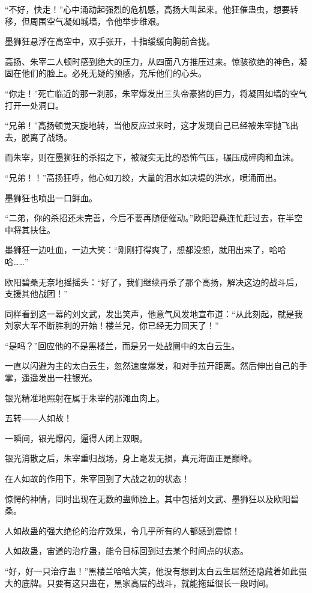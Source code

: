 \begin{this_body}
“不好，快走！”心中涌动起强烈的危机感，高扬大叫起来。他狂催蛊虫，想要转移，但周围空气凝如城墙，令他举步维艰。

墨狮狂悬浮在高空中，双手张开，十指缓缓向胸前合拢。

高扬、朱宰二人顿时感到绝大的压力，从四面八方推压过来。惊骇欲绝的神色，凝固在他们的脸上。必死无疑的预感，充斥他们的心头。

“你走！”死亡临近的那一刹那，朱宰爆发出三头帝豪猪的巨力，将凝固如墙的空气打开一处洞口。

“兄弟！”高扬顿觉天旋地转，当他反应过来时，这才发现自己已经被朱宰抛飞出去，脱离了战场。

而朱宰，则在墨狮狂的杀招之下，被凝实无比的恐怖气压，碾压成碎肉和血沫。

“兄弟！！”高扬狂呼，他心如刀绞，大量的泪水如决堤的洪水，喷涌而出。

墨狮狂也喷出一口鲜血。

“二弟，你的杀招还未完善，今后不要再随便催动。”欧阳碧桑连忙赶过去，在半空中将其扶住。

墨狮狂一边吐血，一边大笑：“刚刚打得爽了，想都没想，就用出来了，哈哈哈……”

欧阳碧桑无奈地摇摇头：“好了，我们继续再杀了那个高扬，解决这边的战斗后，支援其他战团！”

同样看到这一幕的刘文武，发出笑声，他意气风发地宣布道：“从此刻起，就是我刘家大军不断胜利的开始！楼兰兄，你已经无力回天了！”

“是吗？”回应他的不是黑楼兰，而是另一处战圈中的太白云生。

一直以闪避为主的太白云生，忽然速度爆发，和对手拉开距离。然后伸出自己的手掌，遥遥发出一柱银光。

银光精准地照射在属于朱宰的那滩血肉上。

五转――人如故！

一瞬间，银光爆闪，逼得人闭上双眼。

银光消散之后，朱宰重归战场，身上毫发无损，真元海面正是巅峰。

在人如故的作用下，朱宰回到了大战之初的状态！

惊愕的神情，同时出现在无数的蛊师脸上。其中包括刘文武、墨狮狂以及欧阳碧桑。

人如故蛊的强大绝伦的治疗效果，令几乎所有的人都感到震惊！

人如故蛊，宙道的治疗蛊，能令目标回到过去某个时间点的状态。

“好，好一只治疗蛊！”黑楼兰哈哈大笑，他没有想到太白云生居然还隐藏着如此强大的底牌。只要有这只蛊在，黑家高层的战斗，就能拖延很长一段时间。


\end{this_body}
